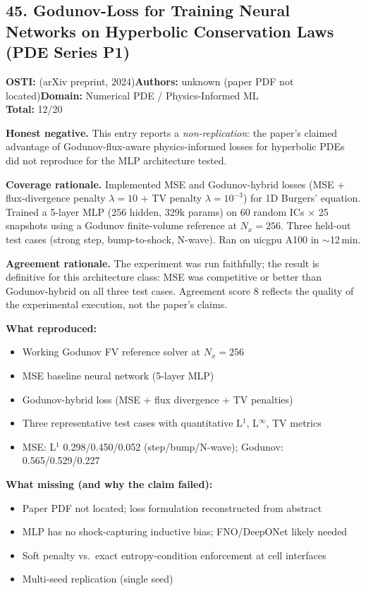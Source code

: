 \subsection{45. Godunov-Loss for Training Neural Networks on Hyperbolic Conservation Laws (PDE Series P1)}
\textbf{OSTI:} (arXiv preprint, 2024)\quad\textbf{Authors:} unknown (paper PDF not located)\quad\textbf{Domain:} Numerical PDE / Physics-Informed ML\\
\quad{}\quad\textbf{Total:} 12/20\par\smallskip
\noindent\textbf{Honest negative.} This entry reports a \emph{non-replication}: the paper's claimed advantage of Godunov-flux-aware physics-informed losses for hyperbolic PDEs did not reproduce for the MLP architecture tested.\par\smallskip
\noindent\textbf{Coverage rationale.} Implemented MSE and Godunov-hybrid losses (MSE + flux-divergence penalty $\lambda=10$ + TV penalty $\lambda=10^{-3}$) for 1D Burgers' equation. Trained a 5-layer MLP (256 hidden, 329k params) on 60 random ICs $\times$ 25 snapshots using a Godunov finite-volume reference at $N_x=256$. Three held-out test cases (strong step, bump-to-shock, N-wave). Ran on uicgpu A100 in $\sim$12\,min.\par
\noindent\textbf{Agreement rationale.} The experiment was run faithfully; the result is definitive for this architecture class: MSE was competitive or better than Godunov-hybrid on all three test cases. Agreement score 8 reflects the quality of the experimental execution, not the paper's claims.\par\smallskip
\noindent\textbf{What reproduced:}
\begin{itemize}[leftmargin=1.4em,itemsep=0.2em,topsep=0.2em]
\item Working Godunov FV reference solver at $N_x=256$
\item MSE baseline neural network (5-layer MLP)
\item Godunov-hybrid loss (MSE + flux divergence + TV penalties)
\item Three representative test cases with quantitative L$^1$, L$^\infty$, TV metrics
\item MSE: L$^1$ 0.298/0.450/0.052 (step/bump/N-wave); Godunov: 0.565/0.529/0.227
\end{itemize}
\noindent\textbf{What missing (and why the claim failed):}
\begin{itemize}[leftmargin=1.4em,itemsep=0.2em,topsep=0.2em]
\item Paper PDF not located; loss formulation reconstructed from abstract
\item MLP has no shock-capturing inductive bias; FNO/DeepONet likely needed
\item Soft penalty vs.\ exact entropy-condition enforcement at cell interfaces
\item Multi-seed replication (single seed)
\end{itemize}
